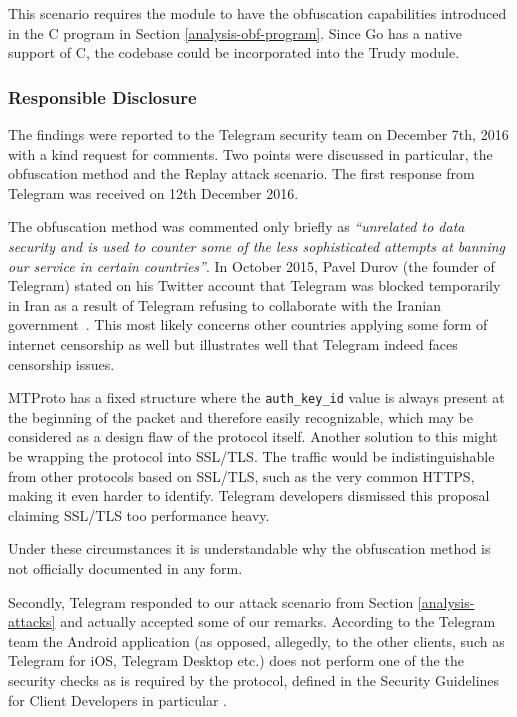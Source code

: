 \documentclass[thesis=M,english]{FITthesis}[2012/10/20]
\begin{document}
This scenario requires the module to have the obfuscation capabilities introduced in the C program in Section \ref{analysis-obf-program}. Since Go has a native support of C, the codebase could be incorporated into the Trudy module.


\subsubsection{Responsible Disclosure}

The findings were reported to the Telegram security team on December 7th, 2016 with a kind request for comments. Two points were discussed in particular, the obfuscation method and the Replay attack scenario. The first response from Telegram was received on 12th December 2016.

The obfuscation method was commented only briefly as \emph{``unrelated to data security and is used to counter some of the less sophisticated attempts at banning our service in certain countries''}. In October 2015, Pavel Durov (the founder of Telegram) stated on his Twitter account that Telegram was blocked temporarily in Iran as a result of Telegram refusing to collaborate with the Iranian government~\cite{telegram-durov-iran}. This most likely concerns other countries applying some form of internet censorship as well but illustrates well that Telegram indeed faces censorship issues.

MTProto has a fixed structure where the \texttt{auth\_key\_id} value is always present at the beginning of the packet and therefore easily recognizable, which may be considered as a design flaw of the protocol itself. Another solution to this might be wrapping the protocol into SSL/TLS. The traffic would be indistinguishable from other protocols based on SSL/TLS, such as the very common HTTPS, making it even harder to identify. Telegram developers dismissed this proposal claiming SSL/TLS too performance heavy.

Under these circumstances it is understandable why the obfuscation method is not officially documented in any form.

Secondly, Telegram responded to our attack scenario from Section \ref{analysis-attacks} and actually accepted some of our remarks. According to the Telegram team the Android application (as opposed, allegedly, to the other clients, such as Telegram for iOS, Telegram Desktop etc.) does not perform one of the the security checks as is required by the protocol, defined in the Security Guidelines for Client Developers in particular \cite{telegram-security-guideline}.
\end{document}
